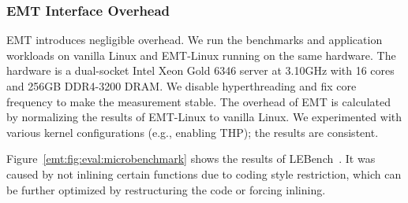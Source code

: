 
\subsubsection{EMT Interface Overhead}
\label{emt:sec:eval:eval-EMT-radix-vs-vanilla}

\noindent
EMT introduces negligible overhead.
We run the benchmarks and application workloads on vanilla Linux and EMT-Linux running on the same hardware.
The hardware is a dual-socket Intel Xeon Gold 6346 server at 3.10GHz
	with 16 cores and 256GB DDR4-3200 DRAM.
We disable hyperthreading and fix core frequency to make the measurement stable.
The overhead of EMT is calculated 
	by normalizing the results of EMT-Linux to vanilla Linux.
We experimented with various kernel configurations (e.g., enabling THP); the 
	results are consistent.

Figure~\ref{emt:fig:eval:microbenchmark} shows the results of  LEBench~\cite{bench:lebench}.
	It was caused by not inlining certain functions %
	due to %
	coding style restriction, %
	which can be further optimized by restructuring the code or forcing inlining.

